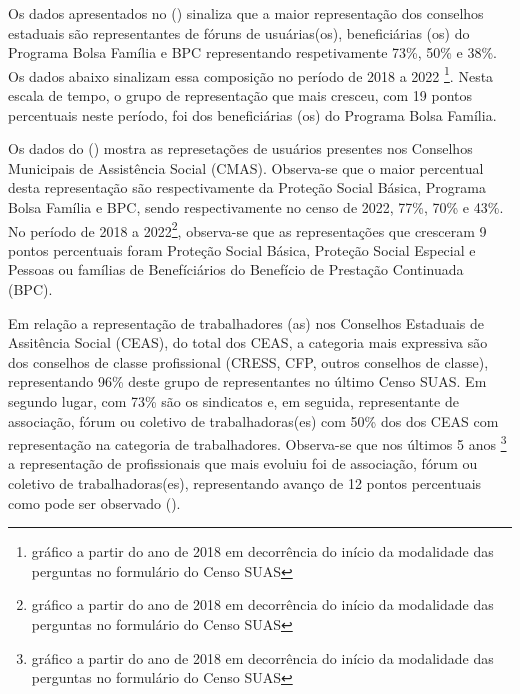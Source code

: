 \documentclass[
  brazilian]{report}
\begin{document}
Os dados apresentados no () sinaliza que a maior
representação dos conselhos estaduais são representantes de fóruns de
usuárias(os), beneficiárias (os) do Programa Bolsa Família e BPC
representando respetivamente 73\%, 50\% e 38\%. Os dados abaixo
sinalizam essa composição no período de 2018 a 2022
\footnote{gráfico a partir do ano de 2018 em decorrência do início da modalidade das perguntas no formulário do Censo SUAS}.
Nesta escala de tempo, o grupo de representação que mais cresceu, com 19
pontos percentuais neste período, foi dos beneficiárias (os) do Programa
Bolsa Família.

Os dados do () mostra as represetações de usuários
presentes nos Conselhos Municipais de Assistência Social (CMAS).
Observa-se que o maior percentual desta representação são
respectivamente da Proteção Social Básica, Programa Bolsa Família e BPC,
sendo respectivamente no censo de 2022, 77\%, 70\% e 43\%. No período de
2018 a
2022\footnote{gráfico a partir do ano de 2018 em decorrência do início da modalidade das perguntas no formulário do Censo SUAS},
observa-se que as representações que cresceram 9 pontos percentuais
foram Proteção Social Básica, Proteção Social Especial e Pessoas ou
famílias de Benefíciários do Benefício de Prestação Continuada (BPC).

Em relação a representação de trabalhadores (as) nos Conselhos Estaduais
de Assitência Social (CEAS), do total dos CEAS, a categoria mais
expressiva são dos conselhos de classe profissional (CRESS, CFP, outros
conselhos de classe), representando 96\% deste grupo de representantes
no último Censo SUAS. Em segundo lugar, com 73\% são os sindicatos e, em
seguida, representante de associação, fórum ou coletivo de
trabalhadoras(es) com 50\% dos dos CEAS com representação na categoria
de trabalhadores. Observa-se que nos últimos 5 anos
\footnote{gráfico a partir do ano de 2018 em decorrência do início da modalidade das perguntas no formulário do Censo SUAS}
a representação de profissionais que mais evoluiu foi de associação,
fórum ou coletivo de trabalhadoras(es), representando avanço de 12
pontos percentuais como pode ser observado ().
\end{document}
